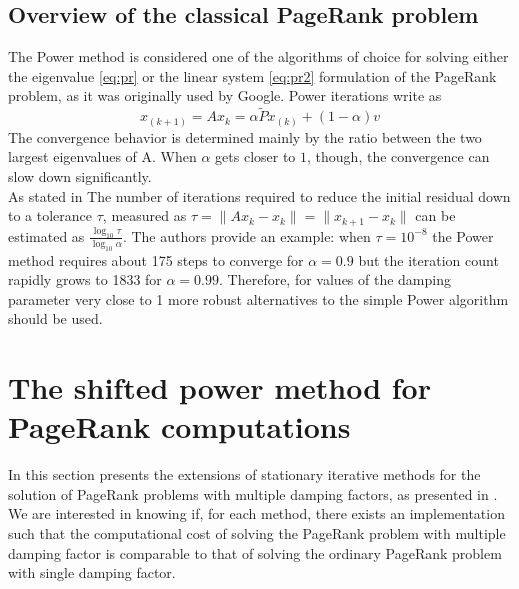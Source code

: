 \documentclass[12pt]{article}
\begin{document}

\subsection{Overview of the classical PageRank problem}
The Power method is considered one of the algorithms of choice for solving either the eigenvalue \ref{eq:pr} or the linear system \ref{eq:pr2} formulation of the PageRank problem, as it was originally used by Google. Power iterations write as
\begin{equation}\label{eq:power}
    x_{(k+1)} = Ax_k =\alpha \tilde P x_{(k)} + (1 - \alpha)v
\end{equation}
The convergence behavior is determined mainly by the ratio between the two largest eigenvalues of A. When $\alpha$ gets closer to $1$, though, the convergence can slow down significantly. \\

\noindent As stated in \cite{SHEN2022126799} The number of iterations required to reduce the initial residual down to a tolerance $\tau$, measured as $\tau = \lVert Ax_k - x_k \rVert = \lVert x_{k+1} - x_k \rVert$ can be estimated as $\frac{\log_{10} \tau}{\log_{10} \alpha}$. The authors provide an example: when $\tau = 10^{-8}$ the Power method requires about 175 steps to converge for $\alpha = 0.9$ but the iteration count rapidly grows to 1833 for $\alpha = 0.99$. Therefore, for values of the damping parameter very close to 1 more robust alternatives to the simple Power algorithm should be used.

\clearpage
\section{The shifted power method for PageRank computations}
In this section presents the extensions of stationary iterative methods for the solution of PageRank problems with multiple damping factors, as presented in \cite{SHEN2022126799}. We are interested in knowing if, for each method, there exists an implementation such that the computational cost of solving the PageRank problem with multiple damping factor is comparable to that of solving the ordinary PageRank problem with single damping factor.
\end{document}
